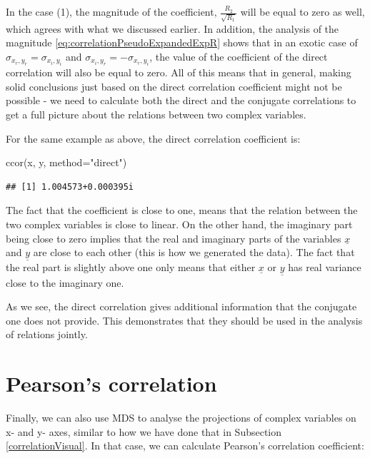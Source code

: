 \documentclass[
]{book}
\newenvironment{Shaded}{\begin{snugshade}}{\end{snugshade}}
\newcommand{\AttributeTok}[1]{\textcolor[rgb]{0.77,0.63,0.00}{#1}}
\newcommand{\FunctionTok}[1]{\textcolor[rgb]{0.00,0.00,0.00}{#1}}
\newcommand{\NormalTok}[1]{#1}
\newcommand{\StringTok}[1]{\textcolor[rgb]{0.31,0.60,0.02}{#1}}
\begin{document}
In the case (1), the magnitude of the coefficient, \(\frac{R_2}{\sqrt{R_1}}\) will be equal to zero as well, which agrees with what we discussed earlier. In addition, the analysis of the magnitude \eqref{eq:correlationPseudoExpandedExpR} shows that in an exotic case of \(\sigma_{x_r, y_r} = \sigma_{x_i, y_i}\) and \(\sigma_{x_i, y_r} = - \sigma_{x_r, y_i}\), the value of the coefficient of the direct correlation will also be equal to zero. All of this means that in general, making solid conclusions just based on the direct correlation coefficient might not be possible - we need to calculate both the direct and the conjugate correlations to get a full picture about the relations between two complex variables.

For the same example as above, the direct correlation coefficient is:

\begin{Shaded}
\begin{Highlighting}[]
\FunctionTok{ccor}\NormalTok{(x, y, }\AttributeTok{method=}\StringTok{"direct"}\NormalTok{)}
\end{Highlighting}
\end{Shaded}

\begin{verbatim}
## [1] 1.004573+0.000395i
\end{verbatim}

The fact that the coefficient is close to one, means that the relation between the two complex variables is close to linear. On the other hand, the imaginary part being close to zero implies that the real and imaginary parts of the variables \(\underline{x}\) and \(\underline{y}\) are close to each other (this is how we generated the data). The fact that the real part is slightly above one only means that either \(\underline{x}\) or \(\underline{y}\) has real variance close to the imaginary one.

As we see, the direct correlation gives additional information that the conjugate one does not provide. This demonstrates that they should be used in the analysis of relations jointly.

\hypertarget{correlationMDSPearson}{%
\section{Pearson's correlation}\label{correlationMDSPearson}}

Finally, we can also use MDS to analyse the projections of complex variables on x- and y- axes, similar to how we have done that in Subsection \ref{correlationVisual}. In that case, we can calculate Pearson's correlation coefficient:
\end{document}
